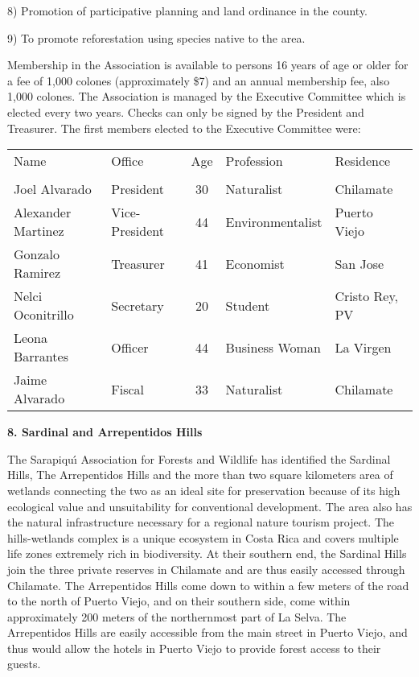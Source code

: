 8)   Promotion of participative planning and land ordinance in the county.

9)   To promote reforestation using species native to the area.
\eXPNS

Membership in the Association is available to persons 16 years of
age or older for a fee of 1,000 colones (approximately \$7) and an
annual membership fee, also 1,000 colones.  The Association is
managed by the Executive Committee which is elected every two
years.  Checks can only be signed by the President and Treasurer.
The first members elected to the Executive Committee were:

\vspace{.5cm}

\begin{tabular}{llcll}

Name               & Office         & Age & Profession       & Residence\\
\\
Joel Alvarado      & President      & 30  & Naturalist       & Chilamate\\
Alexander Martinez & Vice-President & 44  & Environmentalist & Puerto Viejo\\ 
Gonzalo Ramirez    & Treasurer      & 41  & Economist        & San Jose\\
Nelci Oconitrillo  & Secretary      & 20  & Student          & Cristo Rey, PV\\
Leona Barrantes    & Officer        & 44  & Business Woman   & La Virgen\\
Jaime Alvarado     & Fiscal         & 33  & Naturalist       & Chilamate\\

\end{tabular}

\LP
{\large {\bf 8.  Sardinal and Arrepentidos Hills}}
\eLP

The Sarapiqu\'{\i} Association for Forests and Wildlife has identified
the Sardinal Hills, The Arrepentidos Hills and the more than two square
kilometers area of wetlands connecting the two as an ideal site for
preservation because of its high ecological value and unsuitability for
conventional development.  The area also
has the natural infrastructure necessary for a regional nature tourism
project.  The hills-wetlands complex is a unique ecosystem in Costa
Rica and covers multiple life zones extremely rich in biodiversity.
At their southern end, the Sardinal Hills join the three private
reserves in Chilamate and are thus easily accessed through
Chilamate.  The Arrepentidos Hills come down to within a few meters
of the road to the north of Puerto Viejo, and on their southern
side, come within approximately 200 meters of the northernmost part
of La Selva.  The Arrepentidos Hills are easily accessible from the
main street in Puerto Viejo, and thus would allow the hotels in
Puerto Viejo to provide forest access to their guests.

